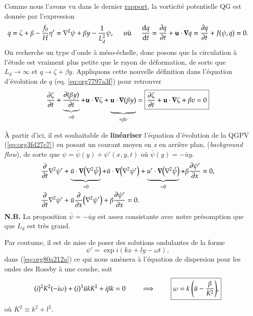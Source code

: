 \documentclass{article}
\numberwithin{equation}{section}
\newcommand{\bigno}{\vphantom{\qty(\frac{d}{q})}}
\begin{document}
Comme nous l'avons vu dans le dernier \href{rapport-2023-03-24.org}{rapport}, la vorticité potentielle QG est donnée par l'expression
\begin{equation}
\label{eq:org7797a3f}
q = \zeta + \beta - \frac{f_0}{H} \eta' = \laplacian \psi + \beta y - \frac{1}{L_d^2} \psi,
\hspace{0.5cm}\text{où}\hspace{0.5cm}
\dv{q}{t} = \pdv{q}{t} + \vb{u} \cdot \gradient q = \pdv{q}{t} + J(\psi,q) =  0.
\end{equation}
On recherche un type d'onde à méso-échelle, donc posons que la circulation à l'étude est vraiment plus petite que le rayon de déformation, de sorte que \(L_d \rightarrow \infty\) et \(q \rightarrow \zeta + \beta y\).
Appliquons cette nouvelle définition dans l'équation d'évolution de \(q\) (eq. \ref{eq:org7797a3f}) pour retrouver
\begin{equation}
\label{eq:org3fd27c7}
\pdv{\zeta}{t} + \underbrace{\pdv{(\beta y)}{t}}_{=0} + \vb{u}\cdot \gradient \zeta + \underbrace{\vb{u} \cdot \gradient(\beta y)\bigno}_{ =\beta v}
= \boxed{
\pdv{\zeta}{t} + \vb{u}\cdot\gradient\zeta  + \beta v = 0
}
\end{equation}

À partir d'ici, il est souhaitable de \textbf{linéariser} l'équation d'évolution de la QGPV (\ref{eq:org3fd27c7}) en posant un courant moyen  en \emph{x} en arrière plan, (\emph{background flow}), de sorte que \(\psi = \bar{\psi}(y) + \psi'(x,y,t)\) où \(\bar{\psi}(y)=-\bar{u}y\).
\begin{align}
\label{eq:org80a212a}
&\pdv{t} \laplacian \psi' + \underbrace{\bar{u}\cdot \gradient (\laplacian \bar{\psi}) }_{=0}
+ \bar{u}\cdot \gradient (\laplacian \psi')
+ \underbrace{u'\cdot \gradient (\laplacian \bar{\psi}) }_{=0}
+ \beta \pdv{\psi'}{x} = 0,\nonumber \\
%
&\pdv{t} \laplacian \psi' + \bar{u}\pdv{x} (\laplacian \psi') + \beta \pdv{\psi'}{x} = 0.
\end{align}
\textbf{N.B.} La proposition \(\bar{\psi} = -\bar{u} y\) est assez consistante avec notre présomption que que \(L_d\) est très grand. \bigskip

Par coutume, il est de mise de poser des solutions ondulantes de la forme
\begin{equation}
\psi' = \exp{i(kx + ly -\omega t)},
\end{equation}
dans (\ref{eq:org80a212a}) ce qui nous amènera à l'équation de dispersion pour les ondes des Rossby à une couche, soit
\begin{equation}
(i)^2 K^2(-i\omega) + (i)^3\bar{u} k K^2 + i \beta k = 0
\hspace{0.8cm}\Longrightarrow\hspace{0.8cm}
\boxed{\omega = k \ \qty(\bar{u} - \frac{\beta}{K^2}),}
\end{equation}
où \(K^2 \equiv k^2 + l^2\).\bigskip
\end{document}
